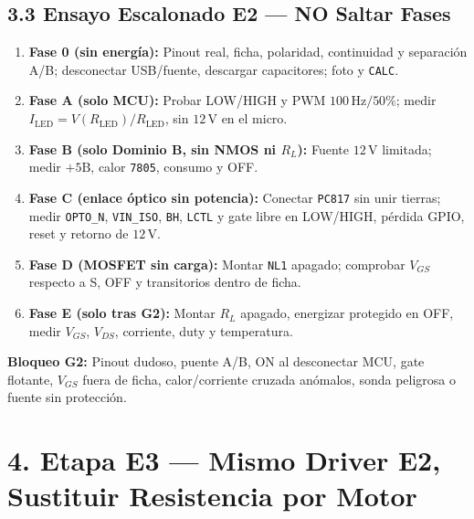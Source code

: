 \documentclass[10pt, a4paper, landscape]{article}
\begin{document}
\begin{minipage}[t]{0.52\linewidth}
\subsection*{3.3 Ensayo Escalonado E2 — NO Saltar Fases}
{\scriptsize
\begin{enumerate}[noitemsep, topsep=2pt]
    \item \textbf{Fase 0 (sin energía):} Pinout real, ficha, polaridad, continuidad y separación A/B; desconectar USB/fuente, descargar capacitores; foto y \texttt{CALC}.
    \item \textbf{Fase A (solo MCU):} Probar LOW/HIGH y PWM $100\,\text{Hz}/50\%$; medir $I_{\text{LED}} = V(R_{\text{LED}})/R_{\text{LED}}$, sin $12\,\text{V}$ en el micro.
    \item \textbf{Fase B (solo Dominio B, sin NMOS ni $R_L$):} Fuente $12\,\text{V}$ limitada; medir $+5\text{B}$, calor \texttt{7805}, consumo y OFF.
    \item \textbf{Fase C (enlace óptico sin potencia):} Conectar \texttt{PC817} sin unir tierras; medir \texttt{OPTO\_N}, \texttt{VIN\_ISO}, \texttt{BH}, \texttt{LCTL} y gate libre en LOW/HIGH, pérdida GPIO, reset y retorno de $12\,\text{V}$.
    \item \textbf{Fase D (MOSFET sin carga):} Montar \texttt{NL1} apagado; comprobar $V_{GS}$ respecto a S, OFF y transitorios dentro de ficha.
    \item \textbf{Fase E (\textcolor{warnred}{solo tras G2}):} Montar $R_L$ apagado, energizar protegido en OFF, medir $V_{GS}$, $V_{DS}$, corriente, duty y temperatura.
\end{enumerate}
\textbf{\textcolor{warnred}{Bloqueo G2:}} Pinout dudoso, puente A/B, ON al desconectar MCU, gate flotante, $V_{GS}$ fuera de ficha, calor/corriente cruzada anómalos, sonda peligrosa o fuente sin protección.
}
\end{minipage}

\newpage
\section*{4. Etapa E3 — Mismo Driver E2, Sustituir Resistencia por Motor}
\end{document}
